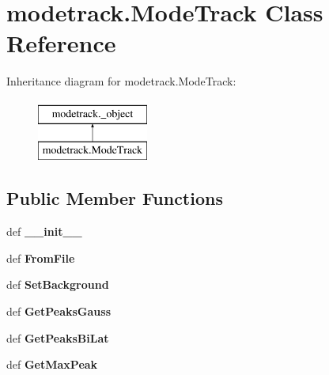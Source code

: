 \hypertarget{classmodetrack_1_1_mode_track}{\section{modetrack.\-Mode\-Track Class Reference}
\label{classmodetrack_1_1_mode_track}
}
Inheritance diagram for modetrack.\-Mode\-Track\-:\begin{figure}[H]
\begin{center}
\leavevmode
\includegraphics[height=2.000000cm]{classmodetrack_1_1_mode_track}
\end{center}
\end{figure}
\subsection*{Public Member Functions}
\begin{DoxyCompactItemize}
\item 
\hypertarget{classmodetrack_1_1_mode_track_a05a40b2371bdb331c86755f34fe85347}{def {\bfseries \-\_\-\-\_\-init\-\_\-\-\_\-}}\label{classmodetrack_1_1_mode_track_a05a40b2371bdb331c86755f34fe85347}

\item 
\hypertarget{classmodetrack_1_1_mode_track_ad7ab77246ecc717a352882bea5201f13}{def {\bfseries From\-File}}\label{classmodetrack_1_1_mode_track_ad7ab77246ecc717a352882bea5201f13}

\item 
\hypertarget{classmodetrack_1_1_mode_track_a964d6958417955c98f47d5db35b46cbe}{def {\bfseries Set\-Background}}\label{classmodetrack_1_1_mode_track_a964d6958417955c98f47d5db35b46cbe}

\item 
\hypertarget{classmodetrack_1_1_mode_track_a4c6135da338d0881912e48ad911da482}{def {\bfseries Get\-Peaks\-Gauss}}\label{classmodetrack_1_1_mode_track_a4c6135da338d0881912e48ad911da482}

\item 
\hypertarget{classmodetrack_1_1_mode_track_a0c459a1807722879287fbab923625008}{def {\bfseries Get\-Peaks\-Bi\-Lat}}\label{classmodetrack_1_1_mode_track_a0c459a1807722879287fbab923625008}

\item 
\hypertarget{classmodetrack_1_1_mode_track_a2318fd84fc3be09ba323d33f8e3cd453}{def {\bfseries Get\-Max\-Peak}}\label{classmodetrack_1_1_mode_track_a2318fd84fc3be09ba323d33f8e3cd453}

\end{DoxyCompactItemize}
